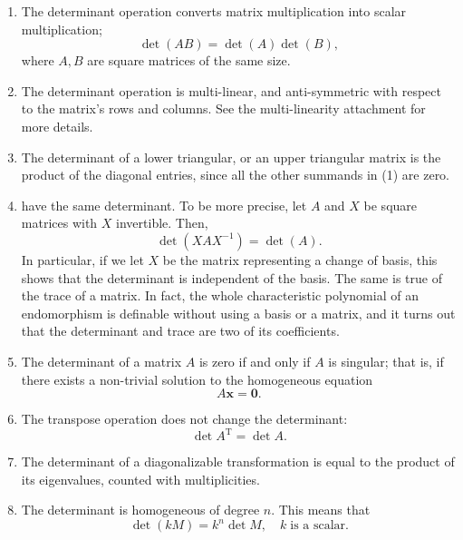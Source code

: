 \documentclass[12pt]{article}
\begin{document}
\begin{enumerate}
\item
\label{pd:mult} The determinant operation converts matrix multiplication into
scalar multiplication;
$$
\det(AB)=\det(A) \det(B),
$$
where $A, B$ are square matrices of the same size.
\item The determinant operation is multi-linear, and anti-symmetric
with respect to the matrix's rows and columns. See the
multi-linearity attachment for more details.
\item The determinant of a lower triangular, or an upper triangular
matrix is the product of the diagonal entries, since all the other summands
in (1) are zero.
\item {}
have the same determinant. To be more precise,
let $A$ and $X$ be square matrices with $X$ invertible. Then,
$$
\det(XAX^{-1})= \det(A).
$$
In particular, if we let $X$ be the matrix representing a change of
basis, this shows that the determinant is independent of the basis.
The same is true of the trace of a matrix. In fact, the whole
characteristic polynomial of an endomorphism is definable without
using a basis or a matrix, and it turns out that the determinant and
trace are two of its coefficients.
\item The determinant of a matrix $A$ is zero if and only if $A$ is
singular; that is, if there exists a non-trivial solution to the
homogeneous equation
$$
A\mathbf{x} = \mathbf{0}.
$$
\item The transpose
operation does not change the determinant:
$$
\det A^{\scriptscriptstyle\mathrm{T}} = \det A.
$$
\item
The determinant of a diagonalizable transformation is equal to the product
of its eigenvalues, counted with multiplicities.
\item The determinant is homogeneous of degree $n$. This means that
$$
\det(k M ) = k^n \det M,\quad k\;\text{is a scalar.}
$$
\end{enumerate}
\end{document}
